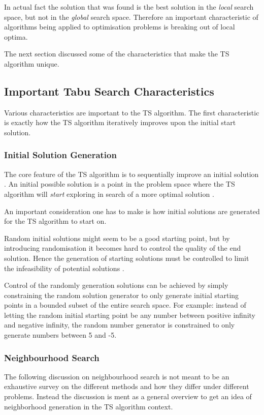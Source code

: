 In actual fact the solution that was found is the best solution in the \emph{local} search space, but not in the \emph{global} search space\cite{CompuIntelligenceIntro,AIModernApproach}. Therefore an important characteristic of algorithms being applied to optimisation problems is breaking out of local optima\cite{CompuIntelligenceIntro,AIModernApproach}.

The next section discussed some of the characteristics that make the \gls{TS} algorithm unique.

\subsection{Important Tabu Search Characteristics}
\label{sec:TScharacteristics}
Various characteristics are important to the \gls{TS} algorithm. The first characteristic is exactly how the \gls{TS} algorithm iteratively improves upon the initial start solution.

\subsubsection{Initial Solution Generation}
The core feature of the \gls{TS} algorithm is to sequentially improve an initial solution \cite{TSHazardous}. An initial possible solution is a point in the problem space where the \gls{TS} algorithm will \emph{start} exploring in search of a more optimal solution \cite{AIModernApproach,TSHazardous}.

An important consideration one has to make is how initial solutions are generated for the \gls{TS} algorithm to start on\cite{AIModernApproach,TSHazardous}.

Random initial solutions might seem to be a good starting point, but by introducing randomisation it becomes hard to control the quality of the end solution\cite{TSHazardous}. Hence the generation of starting solutions must be controlled to limit the infeasibility of potential solutions \cite{TSHazardous}. 

Control of the randomly generation solutions can be achieved by simply constraining the random solution generator to only generate initial starting points in a bounded subset of the entire search space. For example: instead of letting the random initial starting point be any number between positive infinity and negative infinity, the random number generator is constrained to only generate numbers between 5 and -5.

\subsubsection{Neighbourhood Search}
The following discussion on neighbourhood search is not meant to be an exhaustive survey on the different methods and how they differ under different problems. Instead the discussion is ment as a general overview to get an idea of neighborhood generation in the \gls{TS} algorithm context. 

